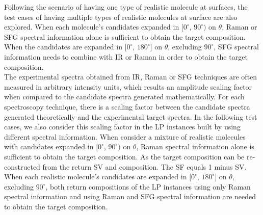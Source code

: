Following the scenario of having one type of realistic molecule at surfaces, the test cases of having multiple types of realistic molecules at surface are also explored. When each molecule's candidates expanded in $[0^{\circ}$, $90^{\circ})$ on $\theta$, Raman or SFG spectral information alone is sufficient to obtain the target composition. When the candidates are expanded in $[0^{\circ}$, $180^{\circ}]$ on $\theta$, excluding $90^{\circ}$, SFG spectral information needs to combine with IR or Raman in order to obtain the target composition. \\

The experimental spectra obtained from IR, Raman or SFG techniques are often measured in arbitrary intensity units, which results an amplitude scaling factor when compared to the candidate spectra generated mathematically. For each spectroscopy technique, there is a scaling factor between the candidate spectra generated theoretically and the experimental target spectra. In the following test cases, we also consider this scaling factor in the LP instances built by using different spectral information. When consider a mixture of realistic molecules with candidates expanded in $[0^{\circ}$, $90^{\circ})$ on $\theta$, Raman spectral information alone is sufficient to obtain the target composition. As the target composition can be re-constructed from the return SV and composition. The SF equals 1 minus SV. When each realistic molecule's candidates are expanded in $[0^{\circ}$, $180^{\circ}]$ on $\theta$, excluding $90^{\circ}$, both return compositions of the LP instances using only Raman spectral information and using Raman and SFG spectral information are needed to obtain the target composition. \\

